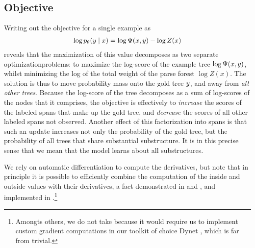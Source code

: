   \subsection{Objective}
    Writing out the objective for a single example as
    \begin{align*}
      \log p_{\theta}(y \mid x) = \log \Psi(x, y) - \log Z(x)
    \end{align*}
    reveals that the maximization of this value decomposes as two separate optimizationproblems: to maximize the log-score of the example tree $\log \Psi(x, y)$, whilst minimizing the log of the total weight of the parse forest $\log Z(x)$. The solution is thus to move probability mass onto the gold tree $y$, and away from \textit{all other trees}. Because the log-score of the tree decomposes as a sum of log-scores of the nodes that it comprises, the objective is effectively to \textit{increase} the scores of the labeled spans that make up the gold tree, and \textit{decrease} the scores of all other labeled spans not observed. Another effect of this factorization into spans is that such an update increases not only the probability of the gold tree, but the probability of all trees that share substantial substructure. It is in this precise sense that we mean that the model learns about all substructures.

    We rely on automatic differentiation to compute the derivatives, but note that in principle it is possible to efficiently combine the computation of the inside and outside values with their derivatives, a fact demonstrated in \citep{eisner2009semirings} and \citep{eisner2016backprop}, and implemented in \citep{kim2017structured}.\footnote{Amongts others, we do not take because it would require us to implement custom gradient computations in our toolkit of choice Dynet \cite{neubig2017dynet}, which is far from trivial.}

